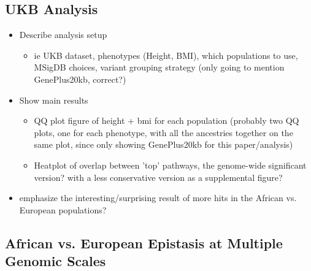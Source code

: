 \documentclass[12pt, a4paper]{article}
\begin{document}
\subsection{UKB Analysis}\label{InterPath-Results-UKBAnalysis}
    
\begin{itemize}
    \item Describe analysis setup
    \begin{itemize}
        \item ie UKB dataset, phenotypes (Height, BMI), which populations to use, MSigDB choices, variant grouping strategy (only going to mention GenePlus20kb, correct?)
    \end{itemize}
    \item Show main results
    \begin{itemize}
        \item QQ plot figure of height + bmi for each population (probably two QQ plots, one for each phenotype, with all the ancestries together on the same plot, since only showing GenePlus20kb for this paper/analysis)
        \item Heatplot of overlap between 'top' pathways, the genome-wide significant version? with a less conservative version as a supplemental figure?
    \end{itemize}
    \item emphasize the interesting/surprising result of more hits in the African vs. European populations?
\end{itemize}

\subsection{African vs. European Epistasis at Multiple Genomic Scales}\label{InterPath-Results-AfricanVsEuropean}
\end{document}
